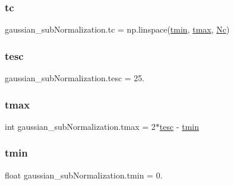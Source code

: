 \mbox{\label{namespacegaussian__subNormalization_afa6e9c91930942dec10f060f861db968}} 
\subsubsection{\texorpdfstring{tc}{tc}}
{\footnotesize\ttfamily gaussian\+\_\+sub\+Normalization.\+tc = np.\+linspace(\hyperlink{namespacegaussian__subNormalization_a12be11a804f6eb95c81b49bf77ac4cf9}{tmin}, \hyperlink{namespacegaussian__subNormalization_a4891507f9d29791fe1a3168ae9e3643e}{tmax}, \hyperlink{namespacegaussian__subNormalization_ad429c93e85cb6578d1b39cad48499521}{Nc})}

\mbox{\label{namespacegaussian__subNormalization_a7c481eda4172efbe519cfee256ff91de}} 
\subsubsection{\texorpdfstring{tesc}{tesc}}
{\footnotesize\ttfamily gaussian\+\_\+sub\+Normalization.\+tesc = 25.}

\mbox{\label{namespacegaussian__subNormalization_a4891507f9d29791fe1a3168ae9e3643e}} 
\subsubsection{\texorpdfstring{tmax}{tmax}}
{\footnotesize\ttfamily int gaussian\+\_\+sub\+Normalization.\+tmax = 2$\ast$\hyperlink{namespacegaussian__subNormalization_a7c481eda4172efbe519cfee256ff91de}{tesc} -\/ \hyperlink{namespacegaussian__subNormalization_a12be11a804f6eb95c81b49bf77ac4cf9}{tmin}}

\mbox{\label{namespacegaussian__subNormalization_a12be11a804f6eb95c81b49bf77ac4cf9}} 
\subsubsection{\texorpdfstring{tmin}{tmin}}
{\footnotesize\ttfamily float gaussian\+\_\+sub\+Normalization.\+tmin = 0.}

